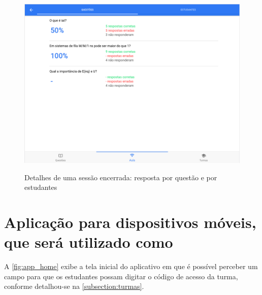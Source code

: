 \begin{figure}[ht]
  \centering
  \caption{Detalhes de uma sessão encerrada: resposta por questão e por estudantes}
  \includegraphics[scale=.35]{imagens/telas/session_students_details}
  \doautor
  \label{fig:session_students_details}
\end{figure}

\clearpage

\section{Aplicação para dispositivos móveis, que será utilizado como {\clickers}}

A \autoref{fig:app_home} exibe a tela inicial do aplicativo em que é possível perceber
um campo para que os estudantes possam digitar o código de acesso da turma, conforme detalhou-se
na \autoref{subsection:turmas}.

